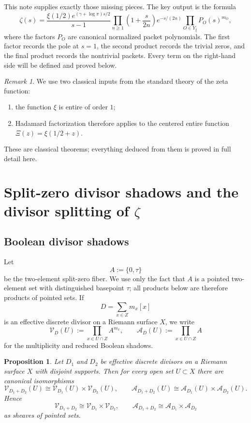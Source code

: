 \documentclass[11pt,a4paper]{article}
\newtheorem{proposition}[theorem]{Proposition}
\theoremstyle{definition}
\theoremstyle{remark}
\newtheorem{remark}[theorem]{Remark}
\newcommand{\cV}{\mathcal V}
\newcommand{\cA}{\mathcal A}
\begin{document}
This note supplies exactly those missing pieces.  The key output is the formula
\begin{equation}\label{eq:intro-main-factorization}
\zeta(s)
=
\frac{\xi(1/2)e^{(\gamma+\log\pi)s/2}}{s-1}
\prod_{n\ge 1}\left(1+\frac{s}{2n}\right)e^{-s/(2n)}
\prod_{O\in Y_\xi} P_O(s)^{m_O},
\end{equation}
where the factors $P_O$ are canonical normalized packet polynomials.  The first factor records the pole at $s=1$, the second product records the trivial zeros, and the final product records the nontrivial packets.  Every term on the right-hand side will be defined and proved below.

\begin{remark}
We use two classical inputs from the standard theory of the zeta function:
\begin{enumerate}[label=(\arabic*)]
\item the function $\xi$ is entire of order $1$;
\item Hadamard factorization therefore applies to the centered entire function $\Xi(z)=\xi(1/2+z)$.
\end{enumerate}
These are classical theorems; everything deduced from them is proved in full detail here.
\end{remark}

\section{Split-zero divisor shadows and the divisor splitting of $\zeta$}

\subsection{Boolean divisor shadows}

Let
\[
A:=\{0,\tau\}
\]
be the two-element split-zero fiber.  We use only the fact that $A$ is a pointed two-element set with distinguished basepoint $\tau$; all products below are therefore products of pointed sets.  If
\[
D=\sum_{x\in Z} m_x[x]
\]
is an effective discrete divisor on a Riemann surface $X$, we write
\begin{equation}\label{eq:shadow-definitions}
\cV_D(U):=\prod_{x\in U\cap Z} A^{m_x},
\qquad
\cA_D(U):=\prod_{x\in U\cap Z} A
\end{equation}
for the multiplicity and reduced Boolean shadows.

\begin{proposition}\label{prop:shadow-product-disjoint}
Let $D_1$ and $D_2$ be effective discrete divisors on a Riemann surface $X$ with disjoint supports.  Then for every open set $U\subset X$ there are canonical isomorphisms
\[
\cV_{D_1+D_2}(U)\cong \cV_{D_1}(U)\times \cV_{D_2}(U),
\qquad
\cA_{D_1+D_2}(U)\cong \cA_{D_1}(U)\times \cA_{D_2}(U).
\]
Hence
\[
\cV_{D_1+D_2}\cong \cV_{D_1}\times \cV_{D_2},
\qquad
\cA_{D_1+D_2}\cong \cA_{D_1}\times \cA_{D_2}
\]
as sheaves of pointed sets.
\end{proposition}
\end{document}
